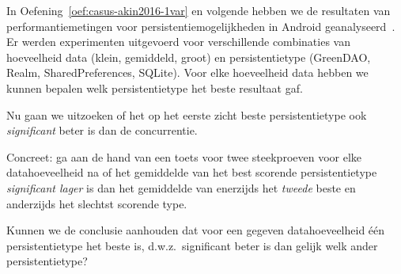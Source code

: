 \begin{exercise}
  \label{oef:casus-akin2016-toets}
  
  In Oefening~\ref{oef:casus-akin2016-1var} en volgende hebben we de resultaten van performantiemetingen voor persistentiemogelijkheden in Android geanalyseerd~\autocite{Akin2016}. Er werden experimenten uitgevoerd voor verschillende combinaties van hoeveelheid data (klein, gemiddeld, groot) en persistentietype (GreenDAO, Realm, SharedPreferences, SQLite). Voor elke hoeveelheid data hebben we kunnen bepalen welk persistentietype het beste resultaat gaf.
  
  Nu gaan we uitzoeken of het op het eerste zicht beste persistentietype ook \emph{significant} beter is dan de concurrentie.
  
  Concreet: ga aan de hand van een toets voor twee steekproeven voor elke datahoeveelheid na of het gemiddelde van het best scorende persistentietype \emph{significant lager} is dan het gemiddelde van enerzijds het \emph{tweede} beste en anderzijds het slechtst scorende type.
  
  Kunnen we de conclusie aanhouden dat voor een gegeven datahoeveelheid één persistentietype het beste is, d.w.z.~significant beter is dan gelijk welk ander persistentietype?
\end{exercise}

